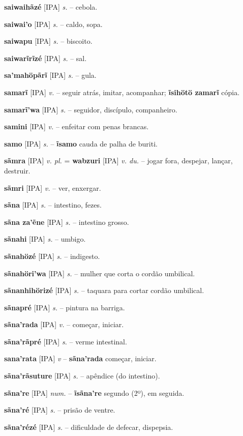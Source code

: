 \textbf{saiwaihãzé} [IPA] \textit{s.} -- cebola.

\textbf{saiwai'o} [IPA] \textit{s.} -- caldo, sopa.

\textbf{saiwapu} [IPA] \textit{s.} -- biscoito.

\textbf{saiwarĩrĩzé} [IPA] \textit{s.} -- sal.

\textbf{sa'mahöpãrĩ} [IPA] \textit{s.} -- gula.

\textbf{samarĩ} [IPA] \textit{v.} -- seguir atrás, imitar, acompanhar; \textbf{ĩsihötö zamarĩ} cópia.

\textbf{samarĩ'wa} [IPA] \textit{s.} -- seguidor, discípulo, companheiro.

\textbf{samini} [IPA] \textit{v.} -- enfeitar com penas brancas.

\textbf{samo} [IPA] \textit{s.} -- \textbf{ĩsamo} cauda de palha de buriti.

\textbf{sãmra} [IPA] \textit{v. pl.} = \textbf{wabzuri} [IPA] \textit{v. du.} -- jogar fora, despejar, lançar, destruir.

\textbf{sãmri} [IPA] \textit{v.} -- ver, enxergar.

\textbf{sãna} [IPA] \textit{s.} -- intestino, fezes.

\textbf{sãna za'ẽne} [IPA] \textit{s.} -- intestino grosso.

\textbf{sãnahi} [IPA] \textit{s.} -- umbigo.

\textbf{sãnahözé} [IPA] \textit{s.} -- indigesto.

\textbf{sãnahöri'wa} [IPA] \textit{s.} -- mulher que corta o cordão umbilical.

\textbf{sãnanhihörizé} [IPA] \textit{s.} -- taquara para cortar cordão umbilical.

\textbf{sãnapré} [IPA] \textit{s.} -- pintura na barriga.

\textbf{sãna'rada} [IPA] \textit{v.} -- começar, iniciar.

\textbf{sãna'rãpré} [IPA] \textit{s.} -- verme intestinal.

\textbf{sana'rata} [IPA] \textit{v} -- \textbf{sãna'rada} começar, iniciar.

\textbf{sãna'rãsuture} [IPA] \textit{s.} -- apêndice (do intestino).

\textbf{sãna're} [IPA] \textit{num.} -- \textbf{ĩsãna're} segundo (2º), em seguida.

\textbf{sãna'ré} [IPA] \textit{s.} -- prisão de ventre.

\textbf{sãna'rézé} [IPA] \textit{s.} -- dificuldade de defecar, dispepsia.

